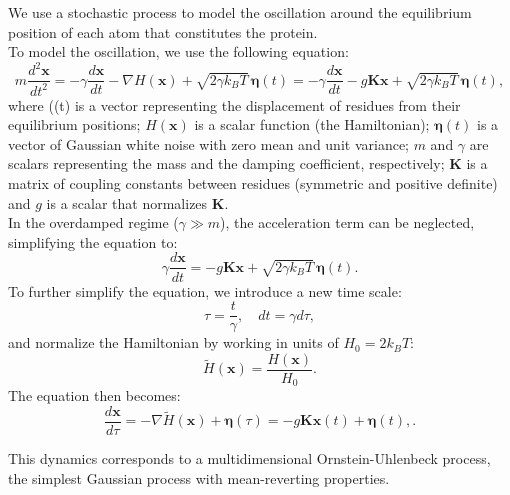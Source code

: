 \documentclass[English, Lau, oneside]{sapthesis}
\begin{document}
\noindent We use a stochastic process to model the oscillation around the equilibrium position of each atom that constitutes the protein.\\

To model the oscillation, we use the following equation:
\[
m \frac{d^2\mathbf{x}}{dt^2} = -\gamma \frac{d\mathbf{x}}{dt} - \nabla H(\mathbf{x}) + \sqrt{2 \gamma k_B T} \, \boldsymbol{\eta}(t) = -\gamma \frac{d\mathbf{x}}{dt} - g \mathbf{K} \mathbf{x} + \sqrt{2 \gamma k_B T} \, \boldsymbol{\eta}(t),
\]
where ((t)\) is a vector representing the displacement of residues from their equilibrium positions; \(H(\mathbf{x})\) is a scalar function (the Hamiltonian); \(\boldsymbol{\eta}(t)\) is a vector of Gaussian white noise with zero mean and unit variance; \(m\) and \(\gamma\) are scalars representing the mass and the damping coefficient, respectively; 
\(\mathbf{K}\) is a matrix of coupling constants between residues (symmetric and positive definite) and \(g\) is a scalar that normalizes \(\mathbf{K}\).\\
In the overdamped regime (\(\gamma \gg m\)), the acceleration term can be neglected, simplifying the equation to:
\[
\gamma \frac{d\mathbf{x}}{dt} = - g \mathbf{K} \mathbf{x} + \sqrt{2 \gamma k_B T} \, \boldsymbol{\eta}(t).
\]
To further simplify the equation, we introduce a new time scale:
\[
\tau = \frac{t}{\gamma}, \quad dt = \gamma d\tau,
\]
and normalize the Hamiltonian by working in units of \(H_0 = 2 k_B T\):
\[
\tilde{H}(\mathbf{x}) = \frac{H(\mathbf{x})}{H_0}.
\]
The equation then becomes:
\[
\frac{d\mathbf{x}}{d\tau} = -\nabla \tilde{H}(\mathbf{x}) + {\boldsymbol{\eta}}(\tau) = -g \mathbf{K} \mathbf{x}(t) + \boldsymbol{\eta}(t),.
\]


This dynamics corresponds to a multidimensional Ornstein-Uhlenbeck process, the simplest Gaussian process with mean-reverting properties.\\
\end{document}
